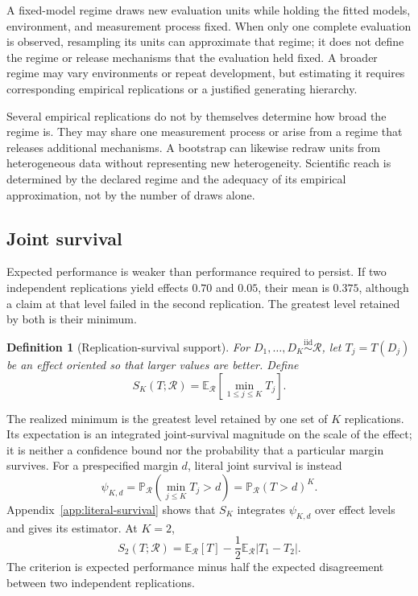 \documentclass[11pt]{article}
\newcommand{\Regime}{\mathcal{R}}
\newcommand{\E}{\mathbb{E}}
\newcommand{\Prb}{\mathbb{P}}
\newcommand{\iid}{\mathrel{\overset{\mathrm{iid}}{\sim}}}
\newtheorem{definition}{Definition}
\theoremstyle{remark}
\begin{document}
A fixed-model regime draws new evaluation units while holding the fitted models, environment, and measurement process fixed. When only one complete evaluation is observed, resampling its units can approximate that regime; it does not define the regime or release mechanisms that the evaluation held fixed. A broader regime may vary environments or repeat development, but estimating it requires corresponding empirical replications or a justified generating hierarchy.

Several empirical replications do not by themselves determine how broad the regime is. They may share one measurement process or arise from a regime that releases additional mechanisms. A bootstrap can likewise redraw units from heterogeneous data without representing new heterogeneity. Scientific reach is determined by the declared regime and the adequacy of its empirical approximation, not by the number of draws alone.

\subsection{Joint survival}

Expected performance is weaker than performance required to persist. If two independent replications yield effects $0.70$ and $0.05$, their mean is $0.375$, although a claim at that level failed in the second replication. The greatest level retained by both is their minimum.

\begin{definition}[Replication-survival support]
For $D_1,\ldots,D_K\iid\Regime$, let $T_j=T(D_j)$ be an effect oriented so that larger values are better. Define
\begin{equation}
S_K(T;\Regime)
=
\E_{\Regime}\left[
\min_{1\leq j\leq K}T_j
\right].
\label{eq:support}
\end{equation}
\end{definition}

The realized minimum is the greatest level retained by one set of $K$ replications. Its expectation is an integrated joint-survival magnitude on the scale of the effect; it is neither a confidence bound nor the probability that a particular margin survives. For a prespecified margin $d$, literal joint survival is instead
\[
\psi_{K,d}
=
\Prb_{\Regime}\left(\min_{j\leq K}T_j>d\right)
=
\Prb_{\Regime}(T>d)^K.
\]
Appendix~\ref{app:literal-survival} shows that $S_K$ integrates $\psi_{K,d}$ over effect levels and gives its estimator. At $K=2$,
\begin{equation}
S_2(T;\Regime)
=
\E_{\Regime}[T]
-
\frac12\E_{\Regime}|T_1-T_2|.
\label{eq:k2}
\end{equation}
The criterion is expected performance minus half the expected disagreement between two independent replications.
\end{document}
